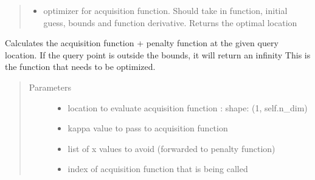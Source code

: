 \documentclass[letterpaper,12pt,english]{sphinxmanual}
\begin{document}
\begin{fulllineitems}
\begin{quote}
\begin{description}
\begin{itemize}
\item {} 
\sphinxAtStartPar
{} \textendash{} optimizer for acquisition function. Should take in function, initial guess, bounds and     function derivative. Returns the optimal location

\end{itemize}

\end{description}\end{quote}

\begin{fulllineitems}
\label{\detokenize{PARyOpt:PARyOpt.paryopt.BayesOpt.acquisition}}
\sphinxAtStartPar
Calculates the acquisition function + penalty function at the given query location.
If the query point is outside the bounds, it will return an infinity
This is the function that needs to be optimized.
\begin{quote}\begin{description}
\item[{Parameters}] \leavevmode\begin{itemize}
\item {} 
\sphinxAtStartPar
{} \textendash{} location to evaluate acquisition function : shape: (1, self.n\_dim)

\item {} 
\sphinxAtStartPar
{} \textendash{} kappa value to pass to acquisition function

\item {} 
\sphinxAtStartPar
{} \textendash{} list of x values to avoid (forwarded to penalty function)

\item {} 
\sphinxAtStartPar
{} \textendash{} index of acquisition function that is being called


\end{itemize}
\end{description}
\end{quote}
\end{fulllineitems}
\end{fulllineitems}
\end{document}
